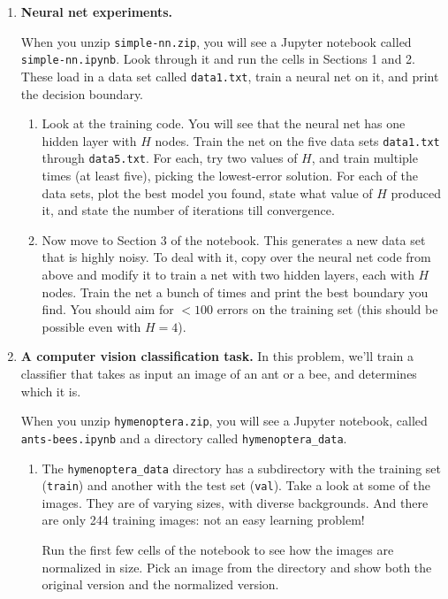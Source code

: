 \documentclass{article}
\begin{document}
\begin{enumerate}
    \item \textbf{Neural net experiments.}

    When you unzip \texttt{simple-nn.zip}, you will see a Jupyter notebook called \texttt{simple-nn.ipynb}. Look through it and run the cells in Sections 1 and 2. These load in a data set called \texttt{data1.txt}, train a neural net on it, and print the decision boundary.

    \begin{enumerate}
        \item Look at the training code. You will see that the neural net has one hidden layer with $H$ nodes. Train the net on the five data sets \texttt{data1.txt} through \texttt{data5.txt}. For each, try two values of $H$, and train multiple times (at least five), picking the lowest-error solution. For each of the data sets, plot the best model you found, state what value of $H$ produced it, and state the number of iterations till convergence.

        \item Now move to Section 3 of the notebook. This generates a new data set that is highly noisy. To deal with it, copy over the neural net code from above and modify it to train a net with two hidden layers, each with $H$ nodes. Train the net a bunch of times and print the best boundary you find. You should aim for $<100$ errors on the training set (this should be possible even with $H=4$).
    \end{enumerate}

    \item \textbf{A computer vision classification task.} In this problem, we'll train a classifier that takes as input an image of an ant or a bee, and determines which it is.

    When you unzip \texttt{hymenoptera.zip}, you will see a Jupyter notebook, called \texttt{ants-bees.ipynb} and a directory called \texttt{hymenoptera\_data}.

    \begin{enumerate}
        \item The \texttt{hymenoptera\_data} directory has a subdirectory with the training set (\texttt{train}) and another with the test set (\texttt{val}). Take a look at some of the images. They are of varying sizes, with diverse backgrounds. And there are only 244 training images: not an easy learning problem!

        Run the first few cells of the notebook to see how the images are normalized in size. Pick an image from the directory and show both the original version and the normalized version.


\end{enumerate}
\end{enumerate}
\end{document}
